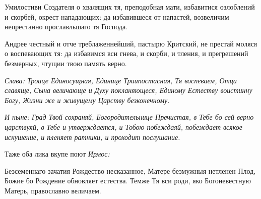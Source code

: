 Умилостиви Создателя о хвалящих тя, преподобная мати, избавитися озлоблений и скорбей, окрест нападающих: да избавившеся от напастей, возвеличим непрестанно прославльшаго тя Господа.




Андрее честный и отче треблаженнейший, пастырю Критский, не престай моляся о воспевающих тя: да избавимся вси гнева, и скорби, и тления, и прегрешений безмерных, чтущии твою память верно.


\itshape Слава\normalfont{}: Троице Единосущная, Единице Триипостасная, Тя воспеваем, Отца славяще, Сына величающе и Духу покланяющеся, Единому Естеству воистинну Богу, Жизни же и живущему Царству безконечному.


\itshape И ныне\normalfont{}: Град Твой сохраняй, Богородительнице Пречистая, в Тебе бо сей верно царствуяй, в Тебе и утверждается, и Тобою побеждаяй, побеждает всякое искушение, и пленяет ратники, и проходит послушание.


Таже оба лика вкупе поют \itshape Ирмос\normalfont{}:


Безсеменнаго зачатия Рождество несказанное, Матере безмужныя нетленен Плод, Божие бо Рождение обновляет естества. Темже Тя вси роди, яко Богоневестную Матерь, православно величаем.\mychapterending

